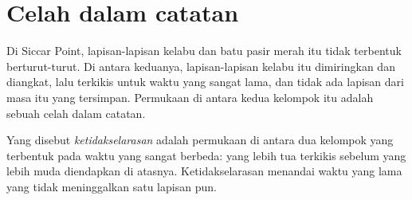 \section{Celah dalam catatan}

Di Siccar Point, lapisan-lapisan kelabu dan batu pasir merah itu tidak
terbentuk berturut-turut. Di antara keduanya, lapisan-lapisan kelabu itu
dimiringkan dan diangkat, lalu terkikis untuk waktu yang sangat lama, dan
tidak ada lapisan dari masa itu yang tersimpan. Permukaan di antara kedua
kelompok  itu adalah sebuah celah dalam catatan.

\begin{definition}[Ketidakselarasan]\label{def:g7:geological-time:unconformity}
Yang disebut \emph{ketidakselarasan} adalah permukaan
 di antara dua kelompok  yang terbentuk pada waktu yang sangat
berbeda:  yang lebih tua terkikis sebelum  yang lebih muda
diendapkan di atasnya. Ketidakselarasan menandai waktu yang lama yang tidak
meninggalkan satu lapisan pun.
\end{definition}

